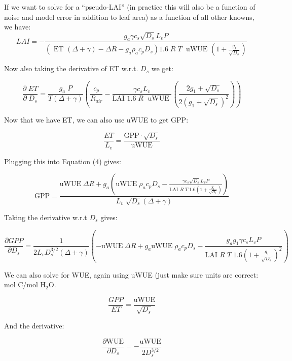 If we want to solve for a ``pseudo-LAI'' (in practice this will also be a function of noise and model error in addition to leaf area) as a function of all other knowns, we have:
\begin{equation}
LAI  = - \frac{g_a \gamma c_s \sqrt{D_s} L_v P }{ \left(\text{ ET } ( \Delta + \gamma) - \Delta R - g_a \rho_a c_p D_{s}\right) 1.6 \; R\; T\; \text{ uWUE } (1 + \frac{g_1}{\sqrt{D_s}})}
\end{equation}

Now also taking the derivative of ET w.r.t. $D_s$ we get:

\begin{equation}
\frac{\partial \;  ET}{\partial \; D_s} = \frac{g_a \; P}{T(\Delta + \gamma)}   \left(\frac{ c_p}{R_{air}} - \frac{\gamma c_s L_v  }{\text{LAI }1.6 \; R\; \text{ uWUE }} \left( \frac{2 g_1 + \sqrt{D_s}}{2 (g_1 + \sqrt{D_s})^2}\right) \right)
\end{equation}

Now that we have ET, we can also use uWUE to get GPP:

\begin{equation}
  \frac{ET}{L_v} = \frac{\text{GPP} \cdot \sqrt{D_s}}{  \text{uWUE}}
\end{equation}

Plugging this into Equation (4) gives:

\begin{equation}
  \text{GPP} = \frac{\text{uWUE}\; \Delta R + g_a \left( \text{uWUE}\; \rho_a c_p D_{s} - \frac{\gamma c_s \sqrt{D_s} L_v P }{\text{LAI } R \; T \; 1.6  (1 + \frac{g_1}{\sqrt{D_s}})} \right) }{L_v \; \sqrt{D_s} \left(\Delta + \gamma \right)}
\end{equation}

Taking the derivative w.r.t $D_s$ gives:

\begin{equation}
  \frac{\partial GPP}{\partial D_s} = \frac{1}{2 L_v D_s^{3/2} \left(\Delta + \gamma \right)} \left( -\text{uWUE}\; \Delta R + g_a \text{uWUE}\; \rho_a c_p  D_s - \frac{g_a g_1  \gamma c_s L_v P }{\text{LAI } R \; T \; 1.6 ( 1 + \frac{g_1}{\sqrt{D_s}})^2 } \right)
\end{equation}

We can also solve for WUE, again using uWUE (just make sure units are correct: mol C/mol H$_2$O.

\begin{equation}
\frac{GPP}{ET} = \frac{\text{uWUE}}{\sqrt{D_s}}
\end{equation}

And the derivative:

\begin{equation}
  \frac{\partial \text{WUE}}{\partial D_s} = -\frac{\text{uWUE}}{2 D_s^{3/2}}
\end{equation}


